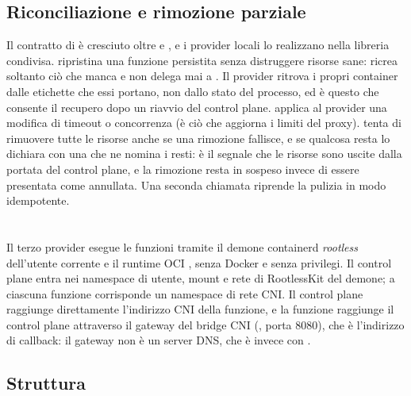 \subsection{Riconciliazione e rimozione parziale}

Il contratto di  \`e cresciuto oltre
 e , e i provider locali lo realizzano nella
libreria condivisa.  ripristina una funzione persistita senza
distruggere risorse sane: ricrea soltanto ci\`o che manca e non delega mai a
. Il provider ritrova i propri container dalle etichette che
essi portano, non dallo stato del processo, ed \`e questo che consente il
recupero dopo un riavvio del control plane.  applica al
provider una modifica di timeout o concorrenza (\`e ci\`o che aggiorna i limiti
del proxy).  tenta di rimuovere tutte le risorse anche se una
rimozione fallisce, e se qualcosa resta lo dichiara con una
 che ne nomina i resti: \`e il segnale che le
risorse sono uscite dalla portata del control plane, e la rimozione resta in
sospeso invece di essere presentata come annullata. Una seconda chiamata riprende la pulizia in modo idempotente.

\section{}

Il terzo provider esegue le funzioni tramite il demone containerd \emph{rootless}
dell'utente corrente e il runtime OCI , senza Docker e senza
privilegi. Il control plane entra nei namespace di utente, mount e rete di
RootlessKit del demone; a ciascuna funzione corrisponde un namespace di rete
CNI. Il control plane raggiunge direttamente l'indirizzo CNI della funzione, e la
funzione raggiunge il control plane attraverso il gateway del bridge CNI
(, porta 8080), che \`e l'indirizzo di callback: il gateway non
\`e un server DNS, che \`e invece  con .

\subsection{Struttura}

